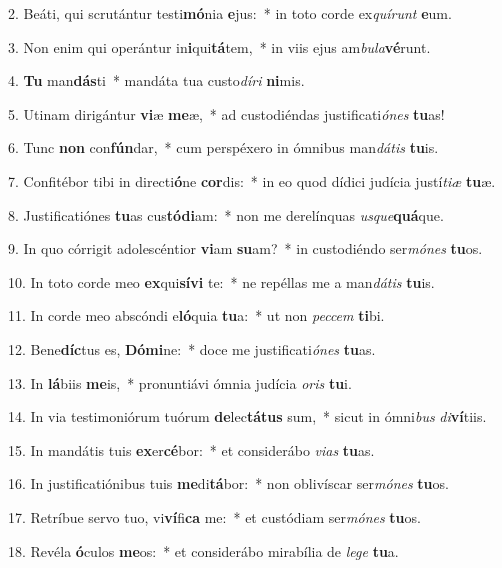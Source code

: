 2. Beáti, qui scrutántur testi\textbf{mó}nia \textbf{e}jus:~*  in toto corde ex\textit{quí}\textit{runt} \textbf{e}um.\

3. Non enim qui operántur in\textbf{i}qui\textbf{tá}tem,~*  in viis ejus am\textit{bu}\textit{la}\textbf{vé}runt.\

4. \textbf{Tu} man\textbf{dás}ti~*  mandáta tua custo\textit{dí}\textit{ri} \textbf{ni}mis.\

5. Utinam dirigántur \textbf{vi}æ \textbf{me}æ,~*  ad custodiéndas justificati\textit{ó}\textit{nes} \textbf{tu}as!\

6. Tunc \textbf{non} con\textbf{fún}dar,~*  cum perspéxero in ómnibus man\textit{dá}\textit{tis} \textbf{tu}is.\

7. Confitébor tibi in directi\textbf{ó}ne \textbf{cor}dis:~*  in eo quod dídici judícia justí\textit{ti}\textit{æ} \textbf{tu}æ.\

8. Justificatiónes \textbf{tu}as cus\textbf{tó}\textbf{di}am:~*  non me derelínquas \textit{us}\textit{que}\textbf{quá}que.\

9. In quo córrigit adolescéntior \textbf{vi}am \textbf{su}am?~*  in custodiéndo ser\textit{mó}\textit{nes} \textbf{tu}os.\

10. In toto corde meo \textbf{ex}qui\textbf{sí}\textbf{vi} te:~*  ne repéllas me a man\textit{dá}\textit{tis} \textbf{tu}is.\

11. In corde meo abscóndi e\textbf{ló}quia \textbf{tu}a:~*  ut non \textit{pec}\textit{cem} \textbf{ti}bi.\

12. Bene\textbf{díc}tus es, \textbf{Dó}\textbf{mi}ne:~*  doce me justificati\textit{ó}\textit{nes} \textbf{tu}as.\

13. In \textbf{lá}biis \textbf{me}is,~*  pronuntiávi ómnia judícia \textit{o}\textit{ris} \textbf{tu}i.\

14. In via testimoniórum tuórum \textbf{de}lec\textbf{tá}\textbf{tus} sum,~*  sicut in ómni\textit{bus} \textit{di}\textbf{ví}tiis.\

15. In mandátis tuis \textbf{ex}er\textbf{cé}bor:~*  et considerábo \textit{vi}\textit{as} \textbf{tu}as.\

16. In justificatiónibus tuis \textbf{me}di\textbf{tá}bor:~*  non oblivíscar ser\textit{mó}\textit{nes} \textbf{tu}os.\

17. Retríbue servo tuo, vi\textbf{ví}fi\textbf{ca} me:~*  et custódiam ser\textit{mó}\textit{nes} \textbf{tu}os.\

18. Revéla \textbf{ó}culos \textbf{me}os:~*  et considerábo mirabília de \textit{le}\textit{ge} \textbf{tu}a.\

